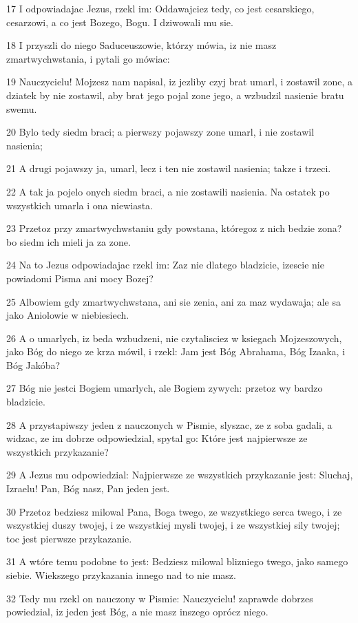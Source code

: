 \par 17 I odpowiadajac Jezus, rzekl im: Oddawajciez tedy, co jest cesarskiego, cesarzowi, a co jest Bozego, Bogu. I dziwowali mu sie.
\par 18 I przyszli do niego Saduceuszowie, którzy mówia, iz nie masz zmartwychwstania, i pytali go mówiac:
\par 19 Nauczycielu! Mojzesz nam napisal, iz jezliby czyj brat umarl, i zostawil zone, a dziatek by nie zostawil, aby brat jego pojal zone jego, a wzbudzil nasienie bratu swemu.
\par 20 Bylo tedy siedm braci; a pierwszy pojawszy zone umarl, i nie zostawil nasienia;
\par 21 A drugi pojawszy ja, umarl, lecz i ten nie zostawil nasienia; takze i trzeci.
\par 22 A tak ja pojelo onych siedm braci, a nie zostawili nasienia. Na ostatek po wszystkich umarla i ona niewiasta.
\par 23 Przetoz przy zmartwychwstaniu gdy powstana, któregoz z nich bedzie zona? bo siedm ich mieli ja za zone.
\par 24 Na to Jezus odpowiadajac rzekl im: Zaz nie dlatego bladzicie, izescie nie powiadomi Pisma ani mocy Bozej?
\par 25 Albowiem gdy zmartwychwstana, ani sie zenia, ani za maz wydawaja; ale sa jako Aniolowie w niebiesiech.
\par 26 A o umarlych, iz beda wzbudzeni, nie czytalisciez w ksiegach Mojzeszowych, jako Bóg do niego ze krza mówil, i rzekl: Jam jest Bóg Abrahama, Bóg Izaaka, i Bóg Jakóba?
\par 27 Bóg nie jestci Bogiem umarlych, ale Bogiem zywych: przetoz wy bardzo bladzicie.
\par 28 A przystapiwszy jeden z nauczonych w Pismie, slyszac, ze z soba gadali, a widzac, ze im dobrze odpowiedzial, spytal go: Które jest najpierwsze ze wszystkich przykazanie?
\par 29 A Jezus mu odpowiedzial: Najpierwsze ze wszystkich przykazanie jest: Sluchaj, Izraelu! Pan, Bóg nasz, Pan jeden jest.
\par 30 Przetoz bedziesz milowal Pana, Boga twego, ze wszystkiego serca twego, i ze wszystkiej duszy twojej, i ze wszystkiej mysli twojej, i ze wszystkiej sily twojej; toc jest pierwsze przykazanie.
\par 31 A wtóre temu podobne to jest: Bedziesz milowal blizniego twego, jako samego siebie. Wiekszego przykazania innego nad to nie masz.
\par 32 Tedy mu rzekl on nauczony w Pismie: Nauczycielu! zaprawde dobrzes powiedzial, iz jeden jest Bóg, a nie masz inszego oprócz niego.
